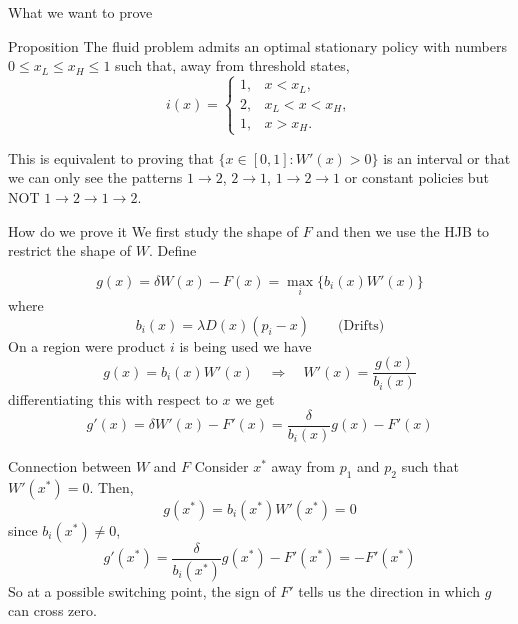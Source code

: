 \documentclass[10pt]{beamer}
\begin{document}
\begin{frame}{What we want to prove}
    \begin{block}{Proposition}
        The fluid problem admits an optimal stationary policy with numbers
        $0\le x_L\le x_H\le1$ such that, away from threshold states,
        \begin{equation*}
        i(x)=
        \begin{cases}
        1,&x<x_L,\\
        2,&x_L<x<x_H,\\
        1,&x>x_H.
        \end{cases}
        \end{equation*}
    \end{block}
    \pause
    This is equivalent to proving that $\{x \in [0,1] : W'(x) >0\}$ is an interval or that we can only see the patterns $1\rightarrow2$, $2\rightarrow1$, $1\rightarrow2\rightarrow1$ or constant policies but NOT $1\rightarrow2\rightarrow1\rightarrow2$.
\end{frame}

\begin{frame}{How do we prove it}
    We first study the shape of $F$ and then we use the HJB to restrict the shape of $W$. Define 

    \begin{equation*}
        g(x) = \delta W(x) -F(x) = \max_i \{b_i(x)W'(x)\}
    \end{equation*}
    where 
    \begin{equation*}
        b_i(x) = \lambda D(x)(p_i - x) \qquad \text{(Drifts)}
    \end{equation*}
    \pause
    On a region were product $i$ is being used we have
    \begin{equation*}
        g(x) = b_i(x)W'(x) \quad \Rightarrow \quad W'(x) = \frac{g(x)}{b_i(x)}
    \end{equation*}
    \pause
    differentiating this with respect to $x$ we get
    \begin{equation*}
        g'(x) =  \delta W'(x) -F'(x) = \frac{\delta}{b_i(x)}g(x) - F'(x)
    \end{equation*}
\end{frame}

\begin{frame}{Connection between $W$ and $F$}
    Consider $x^*$ away from $p_1$ and $p_2$ such that $W'(x^*) = 0$. Then,
    $$g(x^*) = b_i(x^*)W'(x^*) = 0$$ \pause
    since $b_i(x^*) \neq 0$,
    $$g'(x^*) = \frac{\delta}{b_i(x^*)}g(x^*) - F'(x^*) = -F'(x^*)$$
    So at a possible switching point, the sign of $F'$ tells us the direction in which $g$ can cross zero.
\end{frame}
\end{document}
